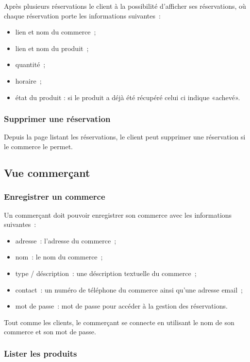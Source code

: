 \documentclass[a4paper,12pt]{article}
\begin{document}
Après plusieurs réservations le client à la possibilité d'afficher ses réservations, où chaque réservation porte les informations suivantes~:

\begin{itemize}
	\item lien et nom du commerce~;
	\item lien et nom du produit~;
	\item quantité~;
	\item horaire~;
	\item état du produit : si le produit a déjà été récupéré celui ci indique «achevé».
\end{itemize}


\subsubsection{Supprimer une réservation}

Depuis la page listant les réservations, le client peut supprimer une réservation si le commerce le permet.

\subsection{Vue commerçant}

\subsubsection{Enregistrer un commerce}

Un commerçant doit pouvoir enregistrer son commerce avec les informations suivantes~:

\begin{itemize}
	\item adresse~: l'adresse du commerce~;
	\item nom~: le nom du commerce~;
	\item type / déscription~: une déscription textuelle du commerce~;
	\item contact~: un numéro de téléphone du commerce ainsi qu'une adresse email~;
	\item mot de passe~: mot de passe pour accéder à la gestion des réservations.
\end{itemize}

Tout comme les clients, le commerçant se connecte en utilisant le nom de son commerce et son mot de passe.

\subsubsection{Lister les produits}
\end{document}
